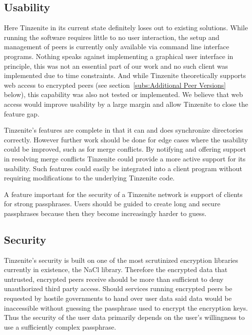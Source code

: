 \subsection{Usability}
\label{sub:Usability}

Here Tinzenite in its current state definitely loses out to existing solutions.
While running the software requires little to no user interaction, the setup and management of peers is currently only available via command line interface programs.
Nothing speaks against implementing a graphical user interface in principle, this was not an essential part of our work and no such client was implemented due to time constraints.
And while Tinzenite theoretically supports web access to encrypted peers (see section~\ref{subs:Additional Peer Versions} below), this capability was also not tested or implemented.
We believe that web access would improve usability by a large margin and allow Tinzenite to close the feature gap.

Tinzenite's features are complete in that it can and does synchronize directories correctly.
However further work should be done for edge cases where the usability could be improved, such as for merge conflicts.
By notifying and offering support in resolving merge conflicts Tinzenite could provide a more active support for its usability.
Such features could easily be integrated into a client program without requiring modifications to the underlying Tinzenite code.

A feature important for the security of a Tinzenite network is support of clients for strong passphrases.
Users should be guided to create long and secure passphrases because then they become increasingly harder to guess.

\subsection{Security}
\label{sub:Security}

Tinzenite's security is built on one of the most scrutinized encryption libraries currently in existence, the NaCl library.
Therefore the encrypted data that untrusted, encrypted peers receive should be more than sufficient to deny unauthorized third party access.
Should services running encrypted peers be requested by hostile governments to hand over user data said data would be inaccessible without guessing the passphrase used to encrypt the encryption keys.
Thus the security of the user data primarily depends on the user's willingness to use a sufficiently complex passphrase.

